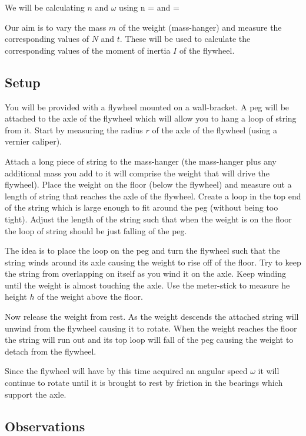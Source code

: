     \eline
    We will be calculating $n$ and $\omega$ using
    \beq \label{n}
        n = 
    \eeq
    and
    \beq \label{omega}
        \omega = 
    \eeq

    Our aim is to vary the mass $m$ of the weight (mass-hanger) and measure the corresponding values of $N$ and $t$. These will be used to calculate the corresponding values of the moment of inertia $I$ of the flywheel.


    \subsection{Setup}

        You will be provided with a flywheel mounted on a wall-bracket. A peg will be attached to the axle of the flywheel which will allow you to hang a loop of string from it. Start by measuring the radius $r$ of the axle of the flywheel (using a vernier caliper).

        Attach a long piece of string to the mass-hanger (the mass-hanger plus any additional mass you add to it will comprise the weight that will drive the flywheel). Place the weight on the floor (below the flywheel) and measure out a length of string that reaches the axle of the flywheel. Create a loop in the top end of the string which is large enough to fit around the peg (without being too tight). Adjust the length of the string such that when the weight is on the floor the loop of string should be just falling of the peg.

        The idea is to place the loop on the peg and turn the flywheel such that the string winds around its axle causing the weight to rise off of the floor. Try to keep the string from overlapping on itself as you wind it on the axle. Keep winding until the weight is almost touching the axle. Use the meter-stick to measure he height $h$ of the weight above the floor.

        Now release the weight from rest. As the weight descends the attached string will unwind from the flywheel causing it to rotate. When the weight reaches the floor the string will run out and its top loop will fall of the peg causing the weight to detach from the flywheel.

        Since the flywheel will have by this time acquired an angular speed $\omega$ it will continue to rotate until it is brought to rest by friction in the bearings which support the axle.


    \subsection{Observations}

